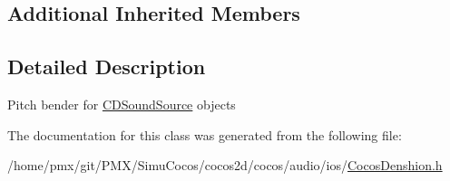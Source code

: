 \subsection*{Additional Inherited Members}


\subsection{Detailed Description}
Pitch bender for \hyperlink{interfaceCDSoundSource}{C\+D\+Sound\+Source} objects 

The documentation for this class was generated from the following file\+:\begin{DoxyCompactItemize}
\item 
/home/pmx/git/\+P\+M\+X/\+Simu\+Cocos/cocos2d/cocos/audio/ios/\hyperlink{cocos2d_2cocos_2audio_2ios_2CocosDenshion_8h}{Cocos\+Denshion.\+h}\end{DoxyCompactItemize}
